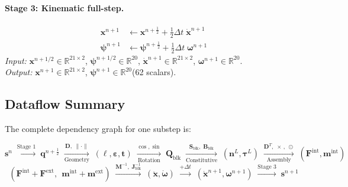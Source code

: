 \documentclass[11pt]{article}
\newcommand{\vect}[1]{\mathbf{#1}}
\newcommand{\mat}[1]{\mathbf{#1}}
\newcommand{\Real}{\mathbb{R}}
\begin{document}
\paragraph{Stage 3: Kinematic full-step.}
\begin{equation}
  \boxed{\;
  \begin{aligned}
    \vect{x}^{n+1} &\leftarrow \vect{x}^{n+\frac{1}{2}} + \tfrac{1}{2}\Delta t\;\dot{\vect{x}}^{n+1} \\
    \bm{\psi}^{n+1} &\leftarrow \bm{\psi}^{n+\frac{1}{2}} + \tfrac{1}{2}\Delta t\;\bm{\omega}^{n+1}
  \end{aligned}
  \;}
  \label{eq:mat-stage3}
\end{equation}
\textit{Input:} $\vect{x}^{n+1/2} \in \Real^{21 \times 2}$, $\bm{\psi}^{n+1/2} \in \Real^{20}$, $\dot{\vect{x}}^{n+1} \in \Real^{21 \times 2}$, $\bm{\omega}^{n+1} \in \Real^{20}$. \\
\textit{Output:} $\vect{x}^{n+1} \in \Real^{21 \times 2}$, $\bm{\psi}^{n+1} \in \Real^{20}$\quad (62 scalars).

\subsection{Dataflow Summary}
\label{sec:dataflow-summary}

The complete dependency graph for one substep is:

\begin{equation}
  \vect{s}^n
  \;\xrightarrow{\text{Stage 1}}\;
  \vect{q}^{n+\frac{1}{2}}
  \;\xrightarrow[\text{Geometry}]{\mat{D},\;\|\cdot\|}\;
  (\bm{\ell}, \bm{\varepsilon}, \vect{t})
  \;\xrightarrow[\text{Rotation}]{\cos,\sin}\;
  \mat{Q}_{\text{blk}}
  \;\xrightarrow[\text{Constitutive}]{\mat{S}_{\text{blk}},\;\mat{B}_{\text{blk}}}\;
  (\vect{n}^L, \bm{\tau}^L)
  \;\xrightarrow[\text{Assembly}]{\mat{D}^T\!,\;\times\,,\;\odot}\;
  (\vect{F}^{\text{int}}, \vect{m}^{\text{int}})
\end{equation}
\begin{equation}
  (\vect{F}^{\text{int}} + \vect{F}^{\text{ext}},\;\, \vect{m}^{\text{int}} + \vect{m}^{\text{ext}})
  \;\xrightarrow{\mat{M}^{-1}\!,\;\mat{J}_{\text{blk}}^{-1}}\;
  (\ddot{\vect{x}}, \dot{\bm{\omega}})
  \;\xrightarrow{+\Delta t}\;
  (\dot{\vect{x}}^{n+1}, \bm{\omega}^{n+1})
  \;\xrightarrow{\text{Stage 3}}\;
  \vect{s}^{n+1}
\end{equation}
\end{document}
